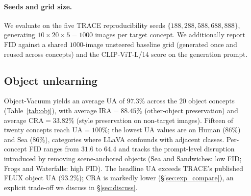 \documentclass{article}
\begin{document}
\paragraph{Seeds and grid size.} We evaluate on the five TRACE
reproducibility seeds $\{188, 288, 588, 688, 888\}$, generating
$10\!\times\!20\!\times\!5{=}1000$ images per target concept. We
additionally report FID against a shared $1000$-image unsteered
baseline grid (generated once and reused across concepts) and the
CLIP-ViT-L/14 score on the generation prompt.

\subsection{Object unlearning}
\label{sec:exp_obj}

Object-Vacuum yields an average UA of $\mathbf{97.3\%}$ across the
$20$ object concepts (Table~\ref{tab:obj}), with average
IRA${=}88.45\%$ (other-object preservation) and average
CRA${=}33.82\%$ (style preservation on non-target images). Fifteen of
twenty concepts reach UA${=}100\%$; the lowest UA values are on
Human ($86\%$) and Sea ($86\%$), categories where LLaVA confounds
with adjacent classes. Per-concept FID ranges from $31.6$ to $64.4$
and tracks the prompt-level disruption introduced by removing
scene-anchored objects (Sea and Sandwiches: low FID; Frogs and
Waterfalls: high FID). The headline UA exceeds TRACE's published
FLUX object UA ($93.2\%$); CRA is markedly lower
(\S\ref{sec:exp_compare}), an explicit trade-off we discuss in
\S\ref{sec:discuss}.
\end{document}
